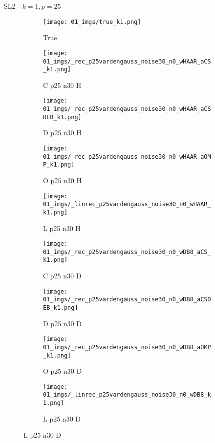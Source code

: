 \begin{frame}{SL2 - $k=1,p=25$}{}
\begin{figure}
\begin{subfigure}{0.1\textwidth}
\texttt{[image: 01\_imgs/true\_k1.png]}
\caption*{\Tiny True}
\end{subfigure}
\begin{subfigure}{0.1\textwidth}
\texttt{[image: 01\_imgs/\_rec\_p25vardengauss\_noise30\_n0\_wHAAR\_aCS\_k1.png]}
\caption*{\Tiny C p25 n30 H}
\end{subfigure}
\begin{subfigure}{0.1\textwidth}
\texttt{[image: 01\_imgs/\_rec\_p25vardengauss\_noise30\_n0\_wHAAR\_aCSDEB\_k1.png]}
\caption*{\Tiny D p25 n30 H}
\end{subfigure}
\begin{subfigure}{0.1\textwidth}
\texttt{[image: 01\_imgs/\_rec\_p25vardengauss\_noise30\_n0\_wHAAR\_aOMP\_k1.png]}
\caption*{\Tiny O p25 n30 H}
\end{subfigure}
\begin{subfigure}{0.1\textwidth}
\texttt{[image: 01\_imgs/\_linrec\_p25vardengauss\_noise30\_n0\_wHAAR\_k1.png]}
\caption*{\Tiny L p25 n30 H}
\end{subfigure}
\begin{subfigure}{0.1\textwidth}
\texttt{[image: 01\_imgs/\_rec\_p25vardengauss\_noise30\_n0\_wDB8\_aCS\_k1.png]}
\caption*{\Tiny C p25 n30 D}
\end{subfigure}
\begin{subfigure}{0.1\textwidth}
\texttt{[image: 01\_imgs/\_rec\_p25vardengauss\_noise30\_n0\_wDB8\_aCSDEB\_k1.png]}
\caption*{\Tiny D p25 n30 D}
\end{subfigure}
\begin{subfigure}{0.1\textwidth}
\texttt{[image: 01\_imgs/\_rec\_p25vardengauss\_noise30\_n0\_wDB8\_aOMP\_k1.png]}
\caption*{\Tiny O p25 n30 D}
\end{subfigure}
\begin{subfigure}{0.1\textwidth}
\texttt{[image: 01\_imgs/\_linrec\_p25vardengauss\_noise30\_n0\_wDB8\_k1.png]}
\caption*{\Tiny L p25 n30 D}
\end{subfigure}
\end{figure}
\end{frame}

